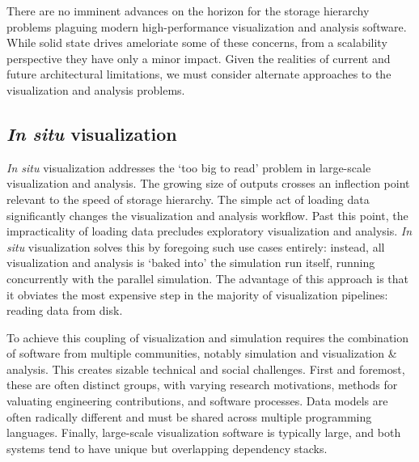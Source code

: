 
There are no imminent advances on the horizon for the storage hierarchy
problems plaguing modern high-performance visualization and analysis
software.  While solid state drives ameloriate some of these concerns,
from a scalability perspective they have only a minor impact.  Given
the realities of current and future architectural limitations, we
must consider alternate approaches to the visualization and analysis
problems.


\subsection{\textit{In situ} visualization}

\textit{In situ} visualization addresses the `too big to read' problem
in large-scale visualization and analysis.  The growing size of outputs
crosses an inflection point relevant to the speed of storage hierarchy.
The simple act of loading data significantly changes the visualization
and analysis workflow.  Past this point, the impracticality of loading
data precludes exploratory visualization and analysis. \textit{In
situ} visualization solves this by foregoing such use cases entirely:
instead, all visualization and analysis is `baked into' the simulation
run itself, running concurrently with the parallel simulation.  The
advantage of this approach is that it obviates the most expensive step
in the majority of visualization pipelines: reading data from disk.


To achieve this coupling of visualization and simulation requires the
combination of software from multiple communities, notably simulation
and visualization \& analysis.  This creates sizable technical and
social challenges.  First and foremost, these are often distinct
groups, with varying research motivations, methods for valuating
engineering contributions, and software processes.  Data models
are often radically different and must be shared across multiple
programming languages.  Finally, large-scale visualization software is
typically large, and both systems tend to have unique but overlapping
dependency stacks.

